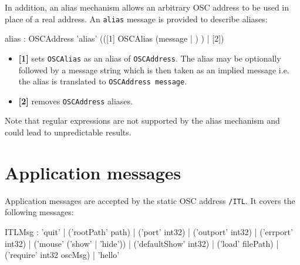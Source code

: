 \documentclass[a4paper,twoside]{report}
\newcommand{\toplevel}[1]	{\chapter{#1}}
\newcommand{\OSC}[1]		{\texttt{#1}}
\begin{document}
In addition, an alias mechanism allows an arbitrary OSC address to be used in place of a real address. An \OSC{alias} message is provided to describe aliases: 
\begin{rail}
alias : OSCAddress 'alias' (([1] OSCAlias (message | ) ) | [2])
\end{rail}
\begin{itemize}
\item \textbf{[1]} sets \OSC{OSCAlias} as an alias of \OSC{OSCAddress}. The alias may be optionally followed by a message string which is then taken as an implied message i.e. the alias is translated to \OSC{OSCAddress message}.
\item \textbf{[2]} removes \OSC{OSCAddress} aliases.
\end{itemize}

Note that regular expressions are not supported by the alias mechanism and could lead to unpredictable results.


\toplevel{Application messages}
\label{ITL}
Application messages are accepted by the static OSC address \OSC{/ITL}. It covers the following messages:
\begin{rail}
ITLMsg : 'quit' 
		| ('rootPath' path) 
		| ('port' int32)
		| ('outport' int32)
		| ('errport' int32)
		| ('mouse' ('show' | 'hide'))
		| ('defaultShow' int32)
		| ('load' filePath)
		| ('require' int32 oscMsg)
		| 'hello'
\end{rail}
\end{document}
